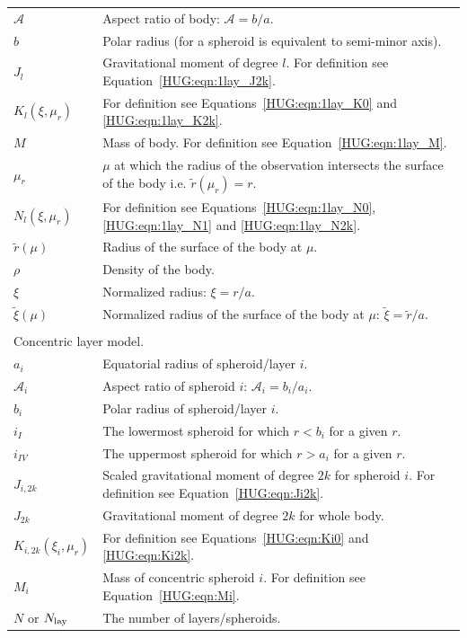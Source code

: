 \documentclass[11pt, oneside]{article}   	%
\begin{document}
\begin{longtable}{l p{12cm}}
$\mathcal{A}$ & Aspect ratio of body: $\mathcal{A}= b/a$. \\
$b$ & Polar radius (for a spheroid is equivalent to semi-minor axis). \\
$J_l $ & Gravitational moment of degree $l$. For definition see Equation~\ref{HUG:eqn:1lay_J2k}. \\
$K_l (\xi, \mu_r)$ & For definition see Equations~\ref{HUG:eqn:1lay_K0} and \ref{HUG:eqn:1lay_K2k}. \\
$M$ & Mass of body. For definition see Equation~\ref{HUG:eqn:1lay_M}. \\
$\mu_r$ & $\mu$ at which the radius of the observation intersects the surface of the body i.e. $\tilde{r}(\mu_r)=r$. \\
$N_l (\xi, \mu_r)$ & For definition see Equations~\ref{HUG:eqn:1lay_N0}, \ref{HUG:eqn:1lay_N1} and \ref{HUG:eqn:1lay_N2k}. \\
$\tilde{r} (\mu) $ & Radius of the surface of the body at $\mu$.\\
$\rho$ & Density of the body. \\
$\xi$ & Normalized radius: $\xi = r/a $. \\
$\tilde{\xi} (\mu) $ & Normalized radius of the surface of the body at $\mu$: $\tilde{\xi} = \tilde{r}/a $. \\
\multicolumn{2}{l}{} \\
\multicolumn{2}{l}{Concentric layer model.} \\
$a_i$ & Equatorial radius of spheroid/layer $i$. \\
$\mathcal{A}_i$ & Aspect ratio of spheroid $i$: $\mathcal{A}_i = b_i/a_i$. \\
$b_i$ & Polar radius of spheroid/layer $i$. \\
$i_{I}$ & The lowermost spheroid for which $r < b_i $ for a given $r$. \\
$i_{IV}$ &  The uppermost spheroid for which $r > a_i $ for a given $r$. \\
$J_{i, 2k} $ & Scaled gravitational moment of degree $2k$ for spheroid $i$. For definition see Equation~\ref{HUG:eqn:Ji2k}. \\
$J_{2k} $ & Gravitational moment of degree $2k$ for whole body. \\
$K_{i, 2k} (\xi_i, \mu_r)$ & For definition see Equations~\ref{HUG:eqn:Ki0} and \ref{HUG:eqn:Ki2k}. \\
$M_i$ & Mass of concentric spheroid $i$. For definition see Equation~\ref{HUG:eqn:Mi}. \\
$N$ or $N_{\rm lay}$ & The number of layers/spheroids. \\

\end{longtable}
\end{document}
